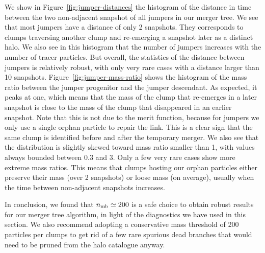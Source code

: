 We show in Figure~\ref{fig:jumper-distances} the histogram of the
distance in time between the two non-adjacent snapshot of all jumpers
in our merger tree. We see that most jumpers have a distance of only 2
snapshots. They corresponds to clumps traversing another clump and
re-emerging a snapshot later as a distinct halo. We also see in
this histogram that the number of jumpers increases with the number of
tracer particles. But overall, the statistics of the distance between
jumpers is relatively robust, with only very rare cases with a
distance larger than 10 snapshots. Figure~\ref{fig:jumper-mass-ratio}
shows the histogram of the mass ratio between the jumper progenitor
and the jumper descendant.  As expected, it peaks at one, which means
that the mass of the clump that re-emerges in a later snapshot is
close to the mass of the clump that disappeared in an earlier
snapshot. Note that this is not due to the merit function, because for
jumpers we only use a single orphan particle to repair the link. This
is a clear sign that the same clump is identified before and after the
temporary merger.  We also see that the distribution is slightly
skewed toward mass ratio smaller than 1, with values always bounded
between 0.3 and 3. Only a few very rare cases show more extreme mass
ratios. This means that clumps hosting our orphan particles either
preserve their mass (over 2 snapshots) or loose mass (on average),
usually when the time between non-adjacent snapshots increases.

In conclusion, we found that $n_{\rm mb} \simeq 200$ is a safe choice
to obtain robust results for our merger tree algorithm, in light of
the diagnostics we have used in this section.  We also recommend
adopting a conservative mass threshold of 200 particles per clumps to
get rid of a few rare spurious dead branches that would need to be
pruned from the halo catalogue anyway.
